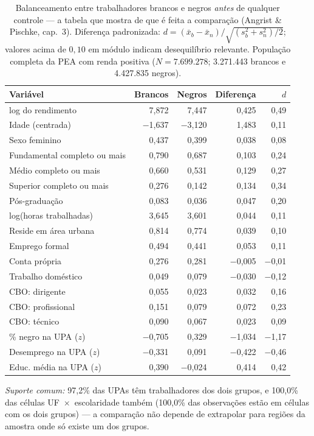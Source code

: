 \begin{table}[!ht]
\centering
\caption{Balanceamento entre trabalhadores brancos e negros \emph{antes} de qualquer
controle --- a tabela que mostra de que é feita a comparação (Angrist \& Pischke, cap.~3).
Diferença padronizada: $d = (\bar x_b - \bar x_n)/\sqrt{(s_b^2+s_n^2)/2}$; valores acima de
$0{,}10$ em módulo indicam desequilíbrio relevante. População completa da PEA com renda
positiva ($N = 7.699.278$; 3.271.443 brancos e 4.427.835 negros).}
\label{tab:balanceamento}
\small
\begin{tabular}{lrrrr}
\toprule
Variável & Brancos & Negros & Diferença & $d$ \\
\midrule
log do rendimento & 7,872 & 7,447 & 0,425 & 0,49 \\
Idade (centrada) & −1,637 & −3,120 & 1,483 & 0,11 \\
Sexo feminino & 0,437 & 0,399 & 0,038 & 0,08 \\
Fundamental completo ou mais & 0,790 & 0,687 & 0,103 & 0,24 \\
Médio completo ou mais & 0,660 & 0,531 & 0,129 & 0,27 \\
Superior completo ou mais & 0,276 & 0,142 & 0,134 & 0,34 \\
Pós-graduação & 0,083 & 0,036 & 0,047 & 0,20 \\
log(horas trabalhadas) & 3,645 & 3,601 & 0,044 & 0,11 \\
Reside em área urbana & 0,814 & 0,774 & 0,039 & 0,10 \\
Emprego formal & 0,494 & 0,441 & 0,053 & 0,11 \\
Conta própria & 0,276 & 0,281 & −0,005 & −0,01 \\
Trabalho doméstico & 0,049 & 0,079 & −0,030 & −0,12 \\
CBO: dirigente & 0,055 & 0,023 & 0,032 & 0,16 \\
CBO: profissional & 0,151 & 0,079 & 0,072 & 0,23 \\
CBO: técnico & 0,090 & 0,067 & 0,023 & 0,09 \\
\% negro na UPA ($z$) & −0,705 & 0,329 & −1,034 & −1,17 \\
Desemprego na UPA ($z$) & −0,331 & 0,091 & −0,422 & −0,46 \\
Educ. média na UPA ($z$) & 0,390 & −0,024 & 0,414 & 0,42 \\
\bottomrule
\end{tabular}
\normalsize
\par\smallskip
\footnotesize\emph{Suporte comum:} 97,2\% das UPAs têm
trabalhadores dos dois grupos, e 100,0\% das células
UF~$\times$~escolaridade também (100,0\% das observações
estão em células com os dois grupos) --- a comparação não depende de extrapolar para
regiões da amostra onde só existe um dos grupos.
\end{table}
